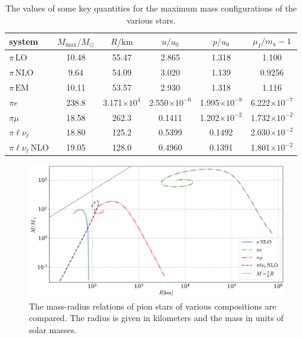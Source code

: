 \begin{table}[H]
    \centering
    \caption{The values of some key quantities for the maximum mass configurations of the various stars.}
    \label{table: key values}
    \begin{tabular}{l  c  c  c  c  c}
        \hline \hline
        system & $M_\text{max}/M_\odot$ & $R / \text{km}$ & 
        $u/u_0$ & $p/u_0$ & $\mu_I/m_\pi-1$ \\
        \hline
        $\pi\, \text{LO}$& 10.48 & 55.47 & 2.865 & 1.318 & 1.100 \\
        $\pi\, \text{NLO}$& 9.64 & 54.09 & 3.020 & 1.139 & 0.9256 \\
        $\pi\, \text{EM}$& 10.11 & 53.57 & 2.930 & 1.318 & 1.116 \\
        $\pi e$& 238.8 & 3.171$\times10^4$ & 
        2.550$\times10^{-6}$ & 1.995$\times10^{-8}$ & 
        6.222$\times10^{-7}$ \\
        $\pi \mu$& 18.58 & 262.3 & 
        0.1411 & 1.202$\times 10^{-2}$ &
        1.732$\times10^{-2}$ \\
        $\pi  \ell  \nu_\ell$& 18.80 & 125.2 &
        0.5399  & 0.1492 &
        2.030$\times10^{-2}$ \\
        $\pi  \ell \nu_\ell\,\text{NLO}$& 19.05 & 128.0 &
        0.4960  & 0.1391 &
        1.801$\times10^{-2}$ \\
        \hline
    \end{tabular}
    \vspace*{3cm}
\end{table}


\clearpage

\begin{figure}[p]
    \centering
    \includegraphics[width=.85\textwidth]{../scripts/figurer/pion_star/mass_radius_all.pdf}
    \caption{
        The mass-radius relations of pion stars of various compositions are compared.
        The radius is given in kilometers and the mass in units of solar masses.
        }
        \label{fig: mass-radius relation with leptons}
\end{figure}

